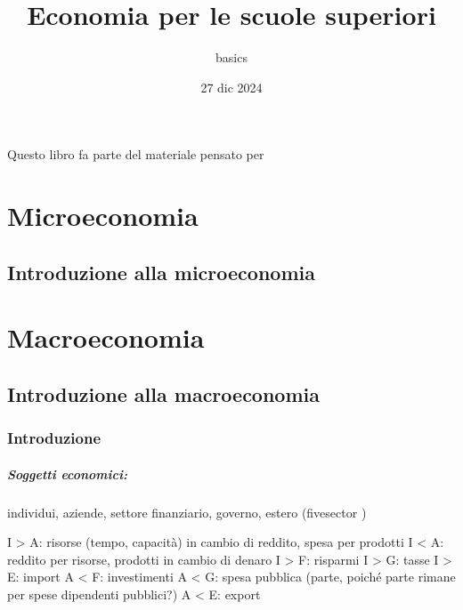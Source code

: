 \documentclass[letterpaper,10pt,italian]{jupyterBook}
\title{Economia per le scuole superiori}
\date{27 dic 2024}
\author{basics}
\begin{document}
\pagestyle{empty}
\sphinxmaketitle
\pagestyle{plain}
\sphinxtableofcontents
\pagestyle{normal}
\label{\detokenize{intro::doc}}


\sphinxAtStartPar
Questo libro fa parte del materiale pensato per 





\sphinxstepscope


\part{Microeconomia}

\sphinxstepscope


\chapter{Introduzione alla microeconomia}
\label{\detokenize{ch/micro:introduzione-alla-microeconomia}}\label{\detokenize{ch/micro:economics-hs-micro}}\label{\detokenize{ch/micro::doc}}
\sphinxstepscope


\part{Macroeconomia}

\sphinxstepscope


\chapter{Introduzione alla macroeconomia}
\label{\detokenize{ch/macro:introduzione-alla-macroeconomia}}\label{\detokenize{ch/macro:economics-hs-macro}}\label{\detokenize{ch/macro::doc}}

\section{Introduzione}
\label{\detokenize{ch/macro:introduzione}}\label{\detokenize{ch/macro:economics-hs-macro-intro}}\subsubsection*{Soggetti economici:}

\sphinxAtStartPar
individui, aziende, settore finanziario, governo, estero (five\sphinxhyphen{}sector )

\sphinxAtStartPar
I \sphinxhyphen{}> A: risorse (tempo, capacità) in cambio di reddito, spesa per prodotti
I <\sphinxhyphen{} A: reddito per risorse, prodotti in cambio di denaro
I \sphinxhyphen{}> F: risparmi
I \sphinxhyphen{}> G: tasse
I \sphinxhyphen{}> E: import
A <\sphinxhyphen{} F: investimenti
A <\sphinxhyphen{} G: spesa pubblica (parte, poiché parte rimane per spese dipendenti pubblici?)
A <\sphinxhyphen{} E: export
\end{document}
